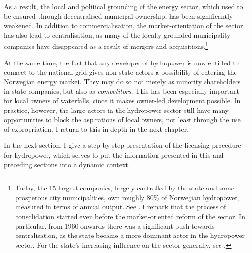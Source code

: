 As a result, the local and political grounding of the energy sector, which used to be ensured through decentralised municipal ownership, has been significantly weakened. In addition to commercialisation, the market-orientation of the sector has also lead to centralisation, as many of the locally grounded municipality companies have disappeared as a result of mergers and acquisitions.\footnote{Today, the 15 largest companies, largely controlled by the state and some prosperous city municipalities, own roughly 80\% of Norwegian hydropower, measured in terms of annual output. See \cite[28]{otprp61}. I remark that the process of consolidation started even before the market-oriented reform of the sector. In particular, from 1960 onwards there was a significant push towards centralisation, as the state became a more dominant actor in the hydropower sector. For the state's increasing influence on the sector generally, see \cite{skjold06,thue06b}.}

At the same time, the fact that any developer of hydropower is now entitled to connect to the national grid gives non-state actors a possibility of entering the Norwegian energy market. They may do so not merely as minority shareholders in state companies, but also as {\it competitors}. This has been especially important for local owners of waterfalls, since it makes owner-led development possible. 
In practice, however, the large actors in the hydropower sector still have many opportunities to block the aspirations of local owners, not least through the use of expropriation. I return to this in depth in the next chapter.

In the next section, I give a step-by-step presentation of the licensing procedure for hydropower, which serves to put the information presented in this and preceding sections into a dynamic context.

